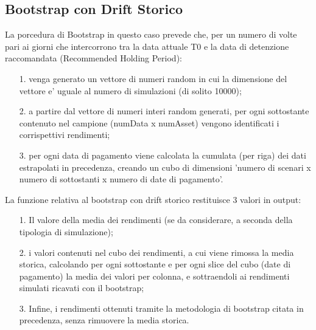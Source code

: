 \documentclass[11pt,fleqn]{extarticle}
\begin{document}
\subsection{Bootstrap con Drift Storico}
La porcedura di Bootstrap in questo caso prevede che, per un numero di volte pari ai giorni che intercorrono tra la data attuale T0 e la data di detenzione raccomandata  (Recommended Holding Period):\newline
\begin{itemize}
\setlength\itemsep{-0.1em}
\item[1.] venga generato un vettore di numeri random in cui la dimensione del vettore e' uguale al numero di simulazioni (di solito 10000);
\item[2.] a partire dal vettore di numeri interi random generati, per ogni sottostante contenuto nel campione (numData x numAsset) vengono identificati i corrispettivi rendimenti;
\item[3.] per ogni data di pagamento viene calcolata la cumulata (per riga) dei dati estrapolati in precedenza, creando un cubo di dimensioni 'numero di scenari x numero di sottostanti x numero di date di pagamento'.
\end{itemize}
La funzione relativa al bootstrap con drift storico restituisce 3 valori in output:
\begin{itemize}
\setlength\itemsep{-0.1em}
\item[1.] Il valore della media dei rendimenti (se da considerare, a seconda della tipologia di simulazione);
\item[2.] i valori contenuti nel cubo dei rendimenti, a cui viene rimossa la media storica, calcolando per ogni sottostante e per ogni slice del cubo (date di pagamento) la media dei valori per colonna, e sottraendoli ai rendimenti simulati ricavati con il bootstrap;
\item[3.] Infine, i rendimenti ottenuti tramite la metodologia di bootstrap citata in precedenza, senza rimuovere la media storica.
\end{itemize}
\end{document}
